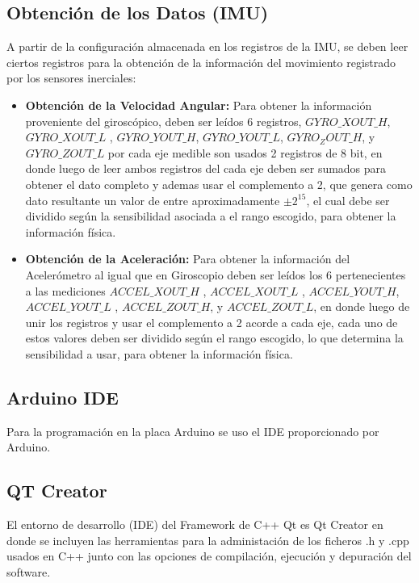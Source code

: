\documentclass[12pt,a4paper]{article}
\begin{document}
\subsection{Obtención de los Datos (IMU)}
A partir de la configuración almacenada en los registros de la IMU,  se deben leer ciertos registros para la obtención de la información del movimiento registrado por los sensores inerciales:

\begin{itemize}
	\item \textbf{Obtención de la Velocidad Angular:} Para obtener la información proveniente del giroscópico, deben ser leídos 6 registros, $GYRO\_XOUT\_H$, $GYRO\_XOUT\_L$ , $GYRO\_YOUT\_H$, $GYRO\_YOUT\_L$, $GYRO_ZOUT\_H$, y $GYRO\_ZOUT\_L$ por cada eje medible son usados 2 registros de 8 bit, en donde luego de leer ambos registros del cada eje deben ser sumados para obtener el dato completo y ademas usar el complemento a 2, que genera como dato resultante un valor de entre aproximadamente $\pm 2^{15}$, el cual debe ser dividido según la sensibilidad asociada a el rango escogido, para obtener la información física.

\item \textbf{Obtención de la Aceleración:} Para obtener la información del  Acelerómetro al igual que en Giroscopio deben ser leídos los 6 pertenecientes a las mediciones $ACCEL\_XOUT\_H$ , $ACCEL\_XOUT\_L$ , $ACCEL\_YOUT\_H$, $ACCEL\_YOUT\_L$ , $ACCEL\_ZOUT\_H$, y $ACCEL\_ZOUT\_L$, en donde luego de unir los registros y usar el complemento a 2 acorde a cada eje, cada uno de estos valores deben ser dividido según el rango escogido, lo que determina la sensibilidad a usar, para obtener la información física.

\end{itemize}

 \subsection{Arduino IDE}
  Para la programación en la placa Arduino \cite{ARDUINO} se uso el IDE proporcionado por Arduino.
  

\subsection{QT Creator}
	El entorno de desarrollo (IDE) del Framework de C++ Qt  es Qt Creator en donde se incluyen las herramientas para la administación de los ficheros .h y .cpp usados en C++ junto con las opciones de compilación, ejecución y depuración del software.
\end{document}
